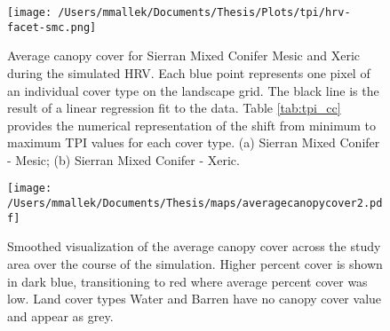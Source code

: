\begin{figure}[!htbp]
\centering
\texttt{[image: /Users/mmallek/Documents/Thesis/Plots/tpi/hrv-facet-smc.png]}
\caption{Average canopy cover for Sierran Mixed Conifer Mesic and Xeric during the simulated HRV. Each blue point represents one pixel of an individual cover type on the landscape grid. The black line is the result of a linear regression fit to the data. Table \ref{tab:tpi_cc} provides the numerical representation of the shift from minimum to maximum TPI values for each cover type. (a) Sierran Mixed Conifer - Mesic; (b) Sierran Mixed Conifer - Xeric.}
\label{fig:tpi_cc_smcs}
\end{figure}

\begin{figure}[!htbp]
\centering
\texttt{[image: /Users/mmallek/Documents/Thesis/maps/averagecanopycover2.pdf]}
\caption{Smoothed visualization of the average canopy cover across the study area over the course of the simulation. Higher percent cover is shown in dark blue, transitioning to red where average percent cover was low. Land cover types Water and Barren have no canopy cover value and appear as grey.}
\label{fig:averagecc}
\end{figure}


